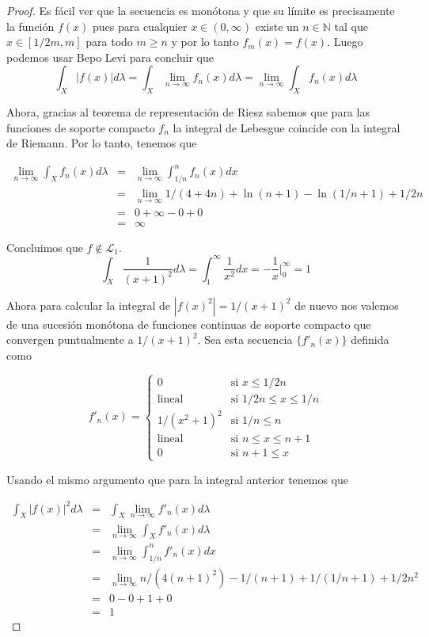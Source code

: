 \documentclass[letter,twoside,12pt]{article}
\numberwithin{equation}{section}
\begin{document}
\begin{enumerate}[label = (\textbf{\arabic*.})]
\begin{proof}
Es fácil ver que la secuencia es monótona y que su límite es precisamente la función $f(x)$ pues para cualquier $x \in (0,\infty)$ existe un $n \in \mathbb{N}$ tal que $x \in [1/2m,m] $ para todo $ m \geq n $ y por lo tanto $ f_m(x) = f(x) $.  
Luego podemos usar Bepo Levi \cite[Teorema 12.22]{hewitt} para concluir que  
\begin{equation}
\int_X |f(x)|d\lambda = \int_X \lim_{n \to \infty} f_n(x)d\lambda = \lim_{n \to \infty} \int_X f_n(x)d\lambda
\end{equation}

Ahora, gracias al teorema de representación de Riesz \cite[Teorema 12.36]{hewitt} sabemos que para las funciones de soporte compacto $ f_n $ la integral de Lebesgue coincide con la integral de Riemann. Por lo tanto, tenemos que 

\begin{eqnarray*}
 \lim_{n \to \infty} \int_X f_n(x)d\lambda &=& \lim_{n \to \infty} \int_{1/n}^n f_n(x)dx
 \\&=& \lim_{n \to \infty} 1/(4+4n) + \ln(n+1)-\ln(1/n+1) + 1/2n
 \\&=& 0 + \infty-0 + 0
  \\&=& \infty
\end{eqnarray*}

Concluimos que $f \not \in \mathcal{L}_1$.
\begin{equation}
\int_X \frac{1}{(x+1)^2}d\lambda = \int_{1}^\infty \frac{1}{x^2}dx = -\frac{1}{x}\Big|_0^\infty = 1
\end{equation}

Ahora para calcular la integral de $ |f(x)^2| = 1/(x+1)^2 $ de nuevo nos valemos de una sucesión monótona de funciones continuas de soporte compacto que convergen puntualmente a $ 1/(x+1)^2 $. Sea esta secuencia $\{f'_n(x)\}$ definida como

$$f'_n(x) = \left\{\begin{array}{ll}
0 & \mbox{si } x \leq 1/2n
\\\mbox{lineal} & \mbox{si } 1/2n \leq x \leq 1/n
\\1/(x^2+1)^2 & \mbox{si } 1/n \leq n 
\\\mbox{lineal} & \mbox{si } n \leq x \leq n+1
\\0 & \mbox{si } n+1 \leq x
\end{array} 
\right. $$

Usando el mismo argumento que para la integral anterior tenemos que 

\begin{eqnarray*}
 \int_X |f(x)|^2d\lambda &=& \int_X \lim_{n \to \infty} f'_n(x)d\lambda
 \\&=&\lim_{n \to \infty} \int_X f'_n(x)d\lambda 
 \\&=& \lim_{n \to \infty} \int_{1/n}^n f'_n(x)dx
 \\&=& \lim_{n \to \infty} n/(4(n+1)^2)-1/(n+1)+1/(1/n+1) + 1/2n^2
 \\&=& 0 -0+ 1 + 0
  \\&=& 1
\end{eqnarray*}


\end{proof}
\end{enumerate}
\end{document}
